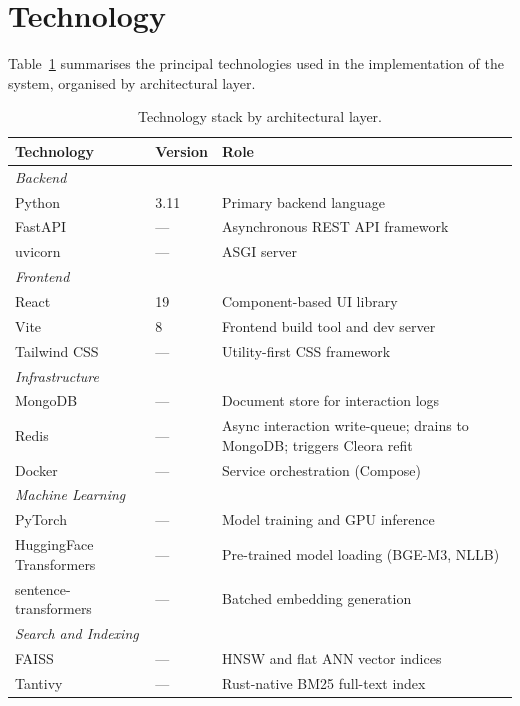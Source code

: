 \section{Technology}
\label{sec:technology}

Table~\ref{tab:technology_stack} summarises the principal technologies used in the implementation of the system, organised by architectural layer.

\begin{table}[H]
\centering
\caption{Technology stack by architectural layer.}
\label{tab:technology_stack}
\begin{tabular}{p{3.8cm} p{2.0cm} p{7.2cm}}
\hline
\textbf{Technology} & \textbf{Version} & \textbf{Role} \\
\hline
\multicolumn{3}{l}{\textit{Backend}} \\
Python             & 3.11       & Primary backend language \\
FastAPI            & —          & Asynchronous REST API framework \\
uvicorn            & —          & ASGI server \\
\hline
\multicolumn{3}{l}{\textit{Frontend}} \\
React              & 19         & Component-based UI library \\
Vite               & 8          & Frontend build tool and dev server \\
Tailwind CSS       & —          & Utility-first CSS framework \\
\hline
\multicolumn{3}{l}{\textit{Infrastructure}} \\
MongoDB            & —          & Document store for interaction logs \\
Redis              & —          & Async interaction write-queue; drains to MongoDB; triggers Cleora refit \\
Docker             & —          & Service orchestration (Compose) \\
\hline
\multicolumn{3}{l}{\textit{Machine Learning}} \\
PyTorch            & —          & Model training and GPU inference \\
HuggingFace Transformers & —   & Pre-trained model loading (BGE-M3, NLLB) \\
sentence-transformers    & —   & Batched embedding generation \\
\hline
\multicolumn{3}{l}{\textit{Search and Indexing}} \\
FAISS~\cite{johnson2021faiss} & — & HNSW and flat ANN vector indices \\
Tantivy            & —          & Rust-native BM25 full-text index \\
\hline
\end{tabular}
\end{table}

